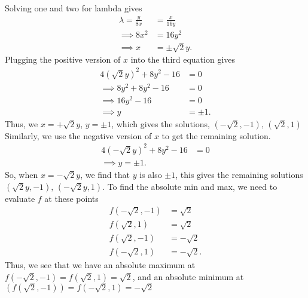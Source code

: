 \documentclass{report}
\begin{document}
            \bigbreak \noindent 
            Solving one and two for lambda gives
            \begin{align*}
                \lambda = \frac{y}{8x} &= \frac{x}{16y} \\
                \implies 8x^{2} &= 16y^{2} \\
                \implies x &= \pm\sqrt{2}y
            .\end{align*}
            Plugging the positive version of $x$ into the third equation gives 
            \begin{align*}
                4(\sqrt{2}y)^{2} +8y^{2} - 16 &= 0 \\
                \implies 8y^{2} + 8y^{2} - 16 &= 0 \\
                \implies 16y^{2} - 16 &= 0 \\
                \implies y&=\pm1
            .\end{align*}
            \bigbreak \noindent 
            Thus, we $x=+\sqrt{2}y $, $y=\pm1$, which gives the solutions, $(-\sqrt{2}, -1),\, (\sqrt{2},1) $
            \bigbreak \noindent 
            Similarly, we use the negative version of $x$ to get the remaining solution.
            \begin{align*}
                4(-\sqrt{2}y)^{2} + 8y^{2} - 16 &= 0 \\
                \implies y= \pm1
            .\end{align*}
            So, when $x=-\sqrt{2}y$, we find that $y$ is also $\pm1$, this gives the remaining solutions $(\sqrt{2}y,-1),\, (-\sqrt{2}y, 1)$. To find the absolute min and max, we need to evaluate $f$ at these points
            \begin{align*}
                f(-\sqrt{2},-1) &= \sqrt{2}\\
                f(\sqrt{2},1) &= \sqrt{2}\\
                f(\sqrt{2},-1) &= -\sqrt{2}\\
                f(-\sqrt{2},1) &= -\sqrt{2}
            .\end{align*}
            \bigbreak \noindent 
            Thus, we see that we have an absolute maximum at $f(-\sqrt{2}, -1) = f(\sqrt{2}, 1) = \sqrt{2}$, and an absolute minimum at $(f(\sqrt{2},-1)) = f(-\sqrt{2}, 1) = -\sqrt{2} $
    


    


 
\end{document}

